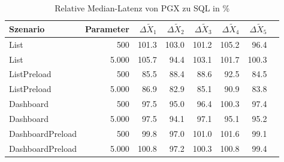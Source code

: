 
\begin{table}[ht]
\setlength{\extrarowheight}{-1pt}
\centering
\caption{Relative Median-Latenz von PGX zu SQL in \%}
\begin{tabular}{lrrrrrrr}
\toprule
Szenario & Parameter & ${\Delta \tilde{X}_1}$ & ${\Delta \tilde{X}_2}$ & ${\Delta \tilde{X}_3}$ & ${\Delta \tilde{X}_4}$ & ${\Delta \tilde{X}_5}$ \\
\midrule
	List & 500 & \cellcolor{red!1}  101.3 & \cellcolor{red!2}  103.0 & \cellcolor{red!1}  101.2 & \cellcolor{red!3}  105.2 & \cellcolor{green!2}  96.4 \\
	List & 5.000 & \cellcolor{red!3}  105.7 & \cellcolor{green!3}  94.4 & \cellcolor{red!2}  103.1 & \cellcolor{red!1}  101.7 & \cellcolor{red!0}  100.3 \\
	ListPreload & 500 & \cellcolor{green!7}  85.5 & \cellcolor{green!6}  88.4 & \cellcolor{green!6}  88.6 & \cellcolor{green!4}  92.5 & \cellcolor{green!8}  84.5 \\
	ListPreload & 5.000 & \cellcolor{green!7}  86.9 & \cellcolor{green!9}  82.9 & \cellcolor{green!7}  85.1 & \cellcolor{green!5}  90.9 & \cellcolor{green!8}  83.8 \\
	Dashboard & 500 & \cellcolor{green!1}  97.5 & \cellcolor{green!2}  95.0 & \cellcolor{green!2}  96.4 & \cellcolor{red!0}  100.3 & \cellcolor{green!1}  97.4 \\
	Dashboard & 5.000 & \cellcolor{green!1}  97.5 & \cellcolor{green!3}  94.1 & \cellcolor{green!1}  97.1 & \cellcolor{green!2}  95.1 & \cellcolor{green!2}  95.2 \\
	DashboardPreload & 500 & \cellcolor{green!0}  99.8 & \cellcolor{green!1}  97.0 & \cellcolor{red!0}  101.0 & \cellcolor{red!1}  101.6 & \cellcolor{green!0}  99.1 \\
	DashboardPreload & 5.000 & \cellcolor{red!0}  100.8 & \cellcolor{green!1}  97.2 & \cellcolor{red!0}  100.3 & \cellcolor{red!0}  100.8 & \cellcolor{green!0}  99.4 \\
\bottomrule
\end{tabular}
\label{tab:relative_latenz_pgx}
\end{table}
	